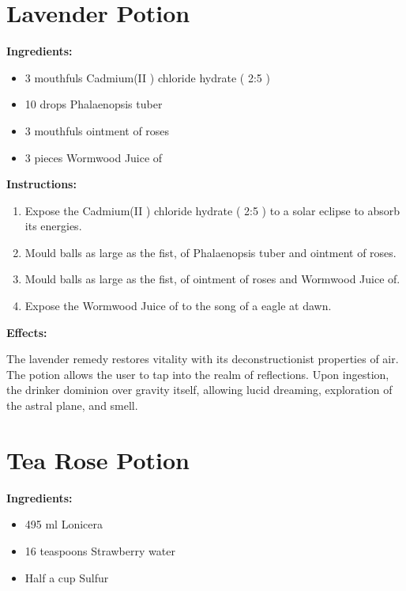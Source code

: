\documentclass{article}
\begin{document}
\newpage
\section*{Lavender Potion}

\textbf{Ingredients:}

\begin{itemize}
  \item 3 mouthfuls Cadmium(II ) chloride hydrate ( 2:5 )
  \item 10 drops Phalaenopsis tuber
  \item 3 mouthfuls ointment of roses
  \item 3 pieces Wormwood Juice of
\end{itemize}

\textbf{Instructions:}

\begin{enumerate}
  \item Expose the Cadmium(II ) chloride hydrate ( 2:5 ) to a solar eclipse to absorb its energies.
  \item Mould balls as large as the fist, of Phalaenopsis tuber and ointment of roses.
  \item Mould balls as large as the fist, of ointment of roses and Wormwood Juice of.
  \item Expose the Wormwood Juice of to the song of a eagle at dawn.
\end{enumerate}

\textbf{Effects:}

The lavender remedy restores vitality with its deconstructionist properties of air. The potion allows the user to tap into the realm of reflections. Upon ingestion, the drinker dominion over gravity itself, allowing lucid dreaming, exploration of the astral plane, and smell.

\newpage
\section*{Tea Rose Potion}

\textbf{Ingredients:}

\begin{itemize}
  \item 495 ml Lonicera
  \item 16 teaspoons Strawberry water
  \item Half a cup Sulfur
\end{itemize}
\end{document}

